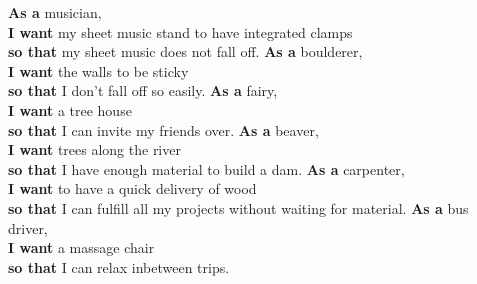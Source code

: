 \documentclass[a5paper, landscape, 38pt]{scrartcl}%
\newcommand{\userstory}[3]{%
\topskip0pt%
\vspace*{\fill}%
\noindent\textbf{As a} #1,\\%
\textbf{I want} #2\\%
\textbf{so that} #3.%
\vspace*{\fill}%
\newpage%
}%
\begin{document}
%
    \userstory{musician}{my sheet music stand to have integrated clamps}{my sheet music does not fall off}%
    \userstory{boulderer}{the walls to be sticky}{I don't fall off so easily}%
    \userstory{fairy}{a tree house}{I can invite my friends over}%
    \userstory{beaver}{trees along the river}{I have enough material to build a dam}%
    \userstory{carpenter}{to have a quick delivery of wood}{I can fulfill all my projects without waiting for material}%
    \userstory{bus driver}{a massage chair}{I can relax inbetween trips}%
\end{document}
